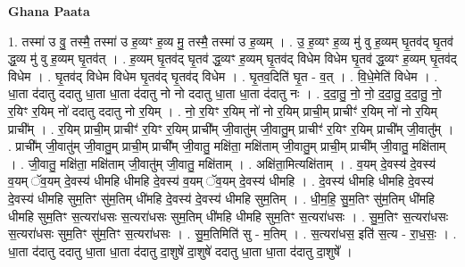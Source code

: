 \documentclass[17pt]{extarticle}
\begin{document}
\textbf{Ghana Paata } \newline

1. तस्मा॑ उ वु॒ तस्मै॒ तस्मा॑ उ ह॒व्यꣳ ह॒व्य मु॒ तस्मै॒ तस्मा॑ उ ह॒व्यम् । . उ॒ ह॒व्यꣳ ह॒व्य मु॑ वु ह॒व्यम् घृ॒तव॑द् घृ॒तव॑ द्ध॒व्य मु॑ वु ह॒व्यम् घृ॒तव॑त् । . ह॒व्यम् घृ॒तव॑द् घृ॒तव॑ द्ध॒व्यꣳ ह॒व्यम् घृ॒तव॑द् विधेम विधेम घृ॒तव॑ द्ध॒व्यꣳ ह॒व्यम् घृ॒तव॑द् विधेम । . घृ॒तव॑द् विधेम विधेम घृ॒तव॑द् घृ॒तव॑द् विधेम । . घृ॒तव॒दिति॑ घृ॒त - व॒त् । . वि॒धे॒मेति॑ विधेम । . धा॒ता द॑दातु ददातु धा॒ता धा॒ता द॑दातु नो नो ददातु धा॒ता धा॒ता द॑दातु नः । . द॒दा॒तु॒ नो॒ नो॒ द॒दा॒तु॒ द॒दा॒तु॒ नो॒ र॒यिꣳ र॒यिम् नो॑ ददातु ददातु नो र॒यिम् । . नो॒ र॒यिꣳ र॒यिम् नो॑ नो र॒यिम् प्राची॒म् प्राचीꣳ॑ र॒यिम् नो॑ नो र॒यिम् प्राची᳚म् । . र॒यिम् प्राची॒म् प्राचीꣳ॑ र॒यिꣳ र॒यिम् प्राची᳚म् जी॒वातु॑म् जी॒वातु॒म् प्राचीꣳ॑ र॒यिꣳ र॒यिम् प्राची᳚म् जी॒वातु᳚म् । . प्राची᳚म् जी॒वातु॑म् जी॒वातु॒म् प्राची॒म् प्राची᳚म् जी॒वातु॒ मक्षि॑ता॒ मक्षि॑ताम् जी॒वातु॒म् प्राची॒म् प्राची᳚म् जी॒वातु॒ मक्षि॑ताम् । . जी॒वातु॒ मक्षि॑ता॒ मक्षि॑ताम् जी॒वातु॑म् जी॒वातु॒ मक्षि॑ताम् । . अक्षि॑ता॒मित्यक्षि॑ताम् । . व॒यम् दे॒वस्य॑ दे॒वस्य॑ व॒यम् ॅव॒यम् दे॒वस्य॑ धीमहि धीमहि दे॒वस्य॑ व॒यम् ॅव॒यम् दे॒वस्य॑ धीमहि । . दे॒वस्य॑ धीमहि धीमहि दे॒वस्य॑ दे॒वस्य॑ धीमहि सुम॒तिꣳ सु॑म॒तिम् धी॑महि दे॒वस्य॑ दे॒वस्य॑ धीमहि सुम॒तिम् । . धी॒म॒हि॒ सु॒म॒तिꣳ सु॑म॒तिम् धी॑महि धीमहि सुम॒तिꣳ स॒त्यरा॑धसः स॒त्यरा॑धसः सुम॒तिम् धी॑महि धीमहि सुम॒तिꣳ स॒त्यरा॑धसः । . सु॒म॒तिꣳ स॒त्यरा॑धसः स॒त्यरा॑धसः सुम॒तिꣳ सु॑म॒तिꣳ स॒त्यरा॑धसः । . सु॒म॒तिमिति॑ सु - म॒तिम् । . स॒त्यरा॑धस॒ इति॑ स॒त्य - रा॒ध॒सः॒ । . धा॒ता द॑दातु ददातु धा॒ता धा॒ता द॑दातु दा॒शुषे॑ दा॒शुषे॑ ददातु धा॒ता धा॒ता द॑दातु दा॒शुषे᳚ । \newline
\end{document}
